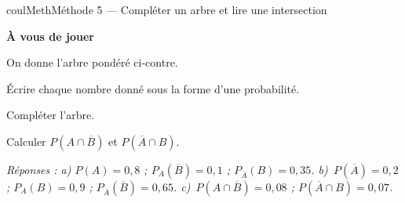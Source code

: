 \documentclass[11pt,a4paper]{article}
\makeatletter
\newcounter{lycee@signet}
\newcommand{\signet}[3][]{\stepcounter{lycee@signet}%
  \edef\lycee@dest{\if\relax\detokenize{#1}\relax
    signet.\arabic{lycee@signet}\else#1\fi}%
  \hypertarget{\lycee@dest}{}\bookmark[level=#2,dest=\lycee@dest]{#3}}
\newcounter{methode}
\newenvironment{methodebox}[1][Méthode]{\stepcounter{methode}%
  \begin{boitecours}[phantom={\signet[methode-\arabic{methode}]{2}{#1}}]{coulMeth}{#1}}%
  {\end{boitecours}}
\newcommand{\etape}[1]{\par\smallskip\textbf{\color{coulMeth}#1}\par\nobreak\smallskip}
\newcommand{\reponse}[1]{\par\smallskip
  {\footnotesize\itshape\color{black!55}Réponses : #1}}
\makeatother
\begin{document}
\begin{methodebox}[Méthode 5 --- Compléter un arbre et lire une intersection]
\etape{À vous de jouer}
\begin{minipage}[c]{0.44\linewidth}\raggedright
On donne l'arbre pondéré ci-contre.
\begin{questions}[label=\alph*)]
  \item Écrire chaque nombre donné sous la forme d'une probabilité.
  \item Compléter l'arbre.
  \item Calculer $P(A\cap\overline{B})$ et $P(\overline{A}\cap B)$.
\end{questions}
\end{minipage}\hfill
\begin{minipage}[c]{0.54\linewidth}\centering
{}
\end{minipage}
\reponse{a) $P(A)=0{,}8$ ; $P_{A}(\overline{B})=0{,}1$ ; $P_{\overline{A}}(B)=0{,}35$.\;
b)~$P(\overline{A})=0{,}2$ ; $P_{A}(B)=0{,}9$ ; $P_{\overline{A}}(\overline{B})=0{,}65$.\;
c)~$P(A\cap\overline{B})=0{,}08$ ; $P(\overline{A}\cap B)=0{,}07$.}
\end{methodebox}
\end{document}
